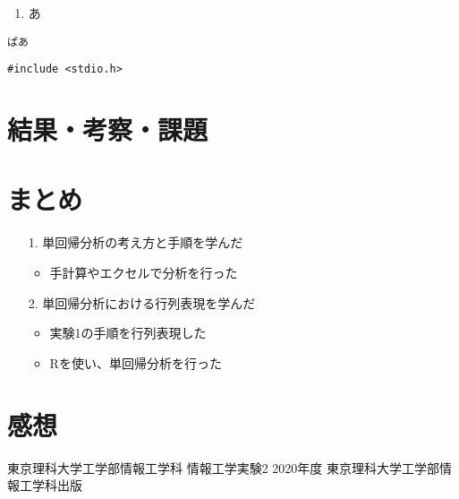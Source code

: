 \documentclass[12pt]{jarticle}
\begin{document}
\begin{enumerate}
    \item あ
\end{enumerate}
\begin{lstlisting}[style=log]
    ぱあ
\end{lstlisting}
\begin{shadebox}
\end{shadebox}
\begin{lstlisting}[caption=read\_2\_1byte.c,label=read,style = lstR]
    #include <stdio.h>
\end{lstlisting}

\section{結果・考察・課題}

\section{まとめ}
\begin{itemize}
    \item [1.]単回帰分析の考え方と手順を学んだ
          \begin{itemize}
              \item 手計算やエクセルで分析を行った
          \end{itemize}
    \item [2.]単回帰分析における行列表現を学んだ
          \begin{itemize}
              \item 実験1の手順を行列表現した
              \item Rを使い、単回帰分析を行った
          \end{itemize}
\end{itemize}

\section{感想}


\clearpage
\begin{thebibliography}{99}
    \label{sannkoubunnkenn_chapter}
    東京理科大学工学部情報工学科 情報工学実験2 2020年度
    東京理科大学工学部情報工学科出版
\end{thebibliography}

\clearpage

\appendix
\end{document}
